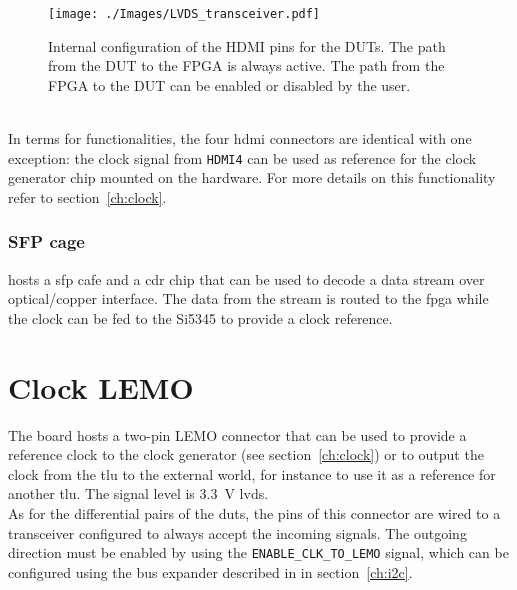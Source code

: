 \begin{figure}
  \centering
  \texttt{[image: ./Images/LVDS\_transceiver.pdf]}
  \caption{Internal configuration of the HDMI pins for the DUTs. The path from the DUT to the FPGA is always active. The path from the FPGA to the DUT can be enabled or disabled by the user.}\label{fig:LVDSTransceiver}
\end{figure}\\
In terms for functionalities, the four \gls{hdmi} connectors are identical with one exception: the clock signal from \verb|HDMI4| can be used as reference for the clock generator chip mounted on the hardware. For more details on this functionality refer to section~\ref{ch:clock}.

\subsubsection{SFP cage}
\brd hosts a \gls{sfp} cafe and a \gls{cdr} chip that can be used to decode a data stream over optical/copper interface. The data from the stream is routed to the \gls{fpga} while the clock can be fed to the Si5345 to provide a clock reference.

\section{Clock LEMO}
The board hosts a two-pin LEMO connector that can be used to provide a reference clock to the clock generator (see section~\ref{ch:clock}) or to output the clock from the \gls{tlu} to the external world, for instance to use it as a reference for another \gls{tlu}. The signal level is 3.3~V \gls{lvds}.\\
As for the differential pairs of the \gls{dut}s, the pins of this connector are wired to a transceiver configured to always accept the incoming signals. The outgoing direction must be enabled by using the \verb|ENABLE_CLK_TO_LEMO| signal, which can be configured using the bus expander described in in section~\ref{ch:i2c}.

